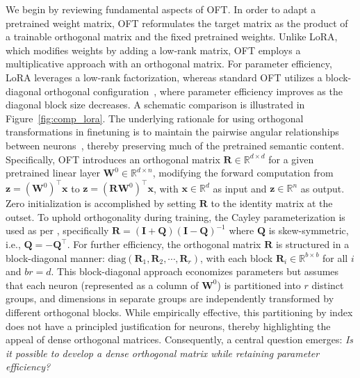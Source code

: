 We begin by reviewing fundamental aspects of OFT. In order to adapt a pretrained weight matrix, OFT reformulates the target matrix as the product of a trainable orthogonal matrix and the fixed pretrained weights. Unlike LoRA, which modifies weights by adding a low-rank matrix, OFT employs a multiplicative approach with an orthogonal matrix. For parameter efficiency, LoRA leverages a low-rank factorization, whereas standard OFT utilizes a block-diagonal orthogonal configuration~\cite{qiu2023controlling}, where parameter efficiency improves as the diagonal block size decreases. A schematic comparison is illustrated in Figure~\ref{fig:comp_lora}. The underlying rationale for using orthogonal transformations in finetuning is to maintain the pairwise angular relationships between neurons~\cite{liu2018learning,liu2021orthogonal,qiu2023controlling}, thereby preserving much of the pretrained semantic content. Specifically, OFT introduces an orthogonal matrix $\bm{R}\in\mathbb{R}^{d\times d}$ for a given pretrained linear layer $\bm{W}^0\in\mathbb{R}^{d\times n}$, modifying the forward computation from $\bm{z}=(\bm{W}^0)^\top\bm{x}$ to $\bm{z}=(\bm{R}\bm{W}^0)^\top\bm{x}$, with $\bm{x}\in\mathbb{R}^d$ as input and $\bm{z}\in\mathbb{R}^n$ as output. Zero initialization is accomplished by setting $\bm{R}$ to the identity matrix at the outset. To uphold orthogonality during training, the Cayley parameterization is used as per \cite{qiu2023controlling,liu2021orthogonal}, specifically $\bm{R}=(\bm{I}+\bm{Q})(\bm{I}-\bm{Q})^{-1}$ where $\bm{Q}$ is skew-symmetric, i.e., $\bm{Q}=-\bm{Q}^\top$. For further efficiency, the orthogonal matrix $\bm{R}$ is structured in a block-diagonal manner: $\text{diag}(\bm{R}_1,\bm{R}_2,\cdots,\bm{R}_r)$, with each block $\bm{R}_i\in\mathbb{R}^{b\times b}$ for all $i$ and $br=d$. This block-diagonal approach economizes parameters but assumes that each neuron (represented as a column of $\bm{W}^0$) is partitioned into $r$ distinct groups, and dimensions in separate groups are independently transformed by different orthogonal blocks. While empirically effective, this partitioning by index does not have a principled justification for neurons, thereby highlighting the appeal of dense orthogonal matrices. Consequently, a central question emerges: \emph{Is it possible to develop a dense orthogonal matrix while retaining parameter efficiency?}

